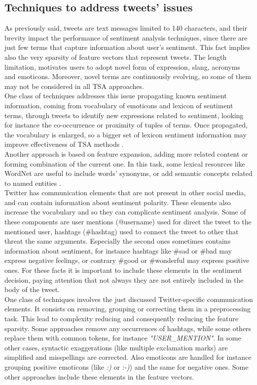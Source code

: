 \subsection{Techniques to address tweets' issues}
As previously said, tweets are text messages limited to 140 characters, and their brevity impact the performance of sentiment analysis techniques, since there are just few terms that capture information about user's sentiment. This fact implies also the very sparsity of feature vectors that represent tweets. The length limitation, motivates users to adopt novel form of expression, slang, acronyms and emoticons. Moreover, novel terms are continuously evolving, so some of them may not be considered in all \ac{TSA} approaches.\\
One class of techniques addresses this issue propagating known sentiment information, coming from vocabulary of emoticons and lexicon of sentiment terms, through tweets to identify new expressions related to sentiment, looking for instance the co-occurrence or proximity of tuples of terms. Once propagated, the vocabulary is enlarged, so a bigger set of lexicon sentiment information may improve effectiveness of \ac{TSA} methods \cite{tang-etal-2014-learning}.\\
Another approach is based on feature expansion, adding more related content or forming combination of the current one. In this task, some lexical resources like WordNet are useful to include words' synonyms, or add semantic concepts related to named entities \cite{montejo-raetz-etal-2014}.\\
Twitter has communication elements that are not present in other social media, and can contain information about sentiment polarity. These elements also increase the vocabulary and so they can complicate sentiment analysis. Some of these components are user mentions (@username) used for direct the tweet to the mentioned user, hashtags (\#hashtag) used to connect the tweet to other that threat the same arguments. Especially the second ones sometimes contains information about sentiment, for instance hashtags like \#sad or \#bad may express negative feelings, or contrary \#good or \#wonderful may express positive ones. For these facts it is important to include these elements in the sentiment decision, paying attention that not always they are not entirely included in the body of the tweet.\\
One class of techniques involves the just discussed Twitter-specific communication elements. It consists on removing, grouping or correcting them in a preprocessing task. This lead to complexity reducing and consequently reducing the feature sparsity. Some approaches remove any occurrences of hashtags, while some others replace them with common tokens, for instance \textit{"USER\_MENTION"}. In some other cases, syntactic exaggerations (like multiple exclamation marks) are simplified and misspellings are corrected. Also emoticons are handled for instance grouping positive emoticons (like \textit{:)} or \textit{:-)}) and the same for negative ones. Some other approaches include these elements in the feature vectors.\\

